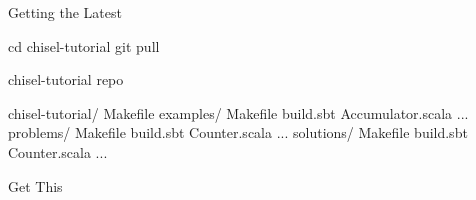 \documentclass[xcolor=pdflatex,dvipsnames,table]{beamer}
\begin{document}
\begin{frame}[fragile]{Getting the Latest}

\begin{scala}
cd chisel-tutorial
git pull
\end{scala}

\end{frame}

\begin{frame}[fragile]{chisel-tutorial repo}
\begin{FramedSemiVerb}
chisel-tutorial/  
  Makefile
  examples/   
    Makefile  
    build.sbt 
    Accumulator.scala ...
  problems/   
    Makefile
    build.sbt 
    Counter.scala ...
  solutions/  
    Makefile
    build.sbt 
    Counter.scala ...
\end{FramedSemiVerb}
\end{frame}

\begin{frame}[fragile]{Get This}

\begin{center}
\end{center}

\end{frame}
\end{document}
